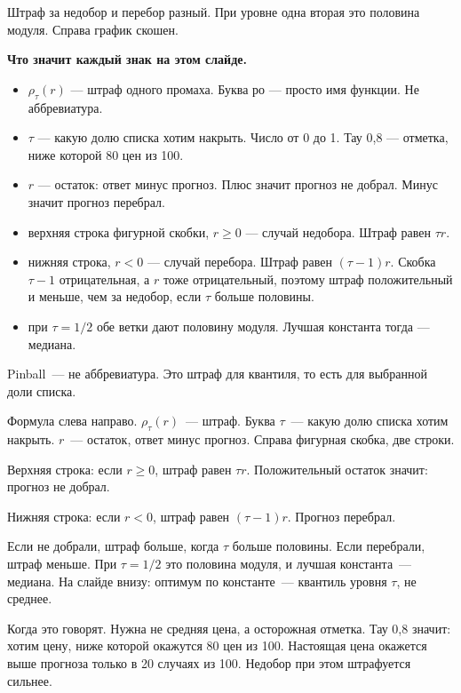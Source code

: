 \documentclass[11pt,a4paper]{article}
\newcommand{\slidehead}[2]{\par\vspace{4mm}{\color{navy}\large\bfseries Слайд #1. #2}\par\vspace{1mm}}
\newcommand{\screen}[1]{\par{\color{ink}\small #1\par}\vspace{1mm}}
\newcommand{\say}[1]{\begin{saybox}#1\end{saybox}}
\newenvironment{signs}{\begin{signbox}{\bfseries Что значит каждый знак на этом слайде.}\par\begin{itemize}[leftmargin=1.15em,itemsep=2pt,topsep=3pt,parsep=0pt]}{\end{itemize}\end{signbox}}
\begin{document}
\slidehead{27}{Pinball}
\screen{Штраф за недобор и перебор разный. При уровне одна вторая это половина модуля. Справа график скошен.}
\begin{signs}
\item \(\rho_{\tau}(r)\) — штраф одного промаха. Буква ро — просто имя функции. Не аббревиатура.
\item \(\tau\) — какую долю списка хотим накрыть. Число от 0 до 1. Тау 0,8 — отметка, ниже которой 80 цен из 100.
\item \(r\) — остаток: ответ минус прогноз. Плюс значит прогноз не добрал. Минус значит прогноз перебрал.
\item верхняя строка фигурной скобки, \(r\ge 0\) — случай недобора. Штраф равен \(\tau r\).
\item нижняя строка, \(r<0\) — случай перебора. Штраф равен \((\tau-1)r\). Скобка \(\tau-1\) отрицательная, а \(r\) тоже отрицательный, поэтому штраф положительный и меньше, чем за недобор, если \(\tau\) больше половины.
\item при \(\tau=1/2\) обе ветки дают половину модуля. Лучшая константа тогда — медиана.
\end{signs}
\say{Pinball~--- не аббревиатура. Это штраф для квантиля, то есть для выбранной доли списка.

Формула слева направо. \(\rho_{\tau}(r)\)~--- штраф. Буква \(\tau\)~--- какую долю списка хотим накрыть. \(r\)~--- остаток, ответ минус прогноз. Справа фигурная скобка, две строки.

Верхняя строка: если \(r\ge 0\), штраф равен \(\tau r\). Положительный остаток значит: прогноз не добрал.

Нижняя строка: если \(r<0\), штраф равен \((\tau-1)r\). Прогноз перебрал.

Если не добрали, штраф больше, когда \(\tau\) больше половины. Если перебрали, штраф меньше. При \(\tau=1/2\) это половина модуля, и лучшая константа~--- медиана. На слайде внизу: оптимум по константе~--- квантиль уровня \(\tau\), не среднее.

Когда это говорят. Нужна не средняя цена, а осторожная отметка. Тау 0,8 значит: хотим цену, ниже которой окажутся 80 цен из 100. Настоящая цена окажется выше прогноза только в 20 случаях из 100. Недобор при этом штрафуется сильнее.}
\end{document}
